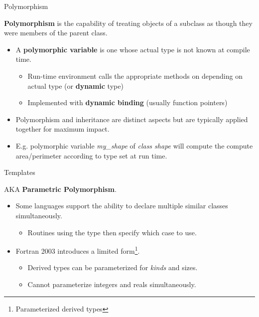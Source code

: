 \documentclass[11pt]{beamer}
\begin{document}
\begin{frame}{Polymorphism}


\textbf{Polymorphism} is the capability of treating objects of a subclass as though they were members of the parent class.
\begin{itemize}

  \item A \textbf{polymorphic variable} is one whose actual type is not known at compile time.
    \begin{itemize}
    \item Run-time environment calls the appropriate methods on depending on actual type (or \textbf{dynamic} type)
    \item Implemented with \textbf{dynamic binding} (usually function pointers)
    \end{itemize}

  \item Polymorphism and inheritance are distinct aspects but are typically applied together for maximum impact.
  \item E.g. polymorphic variable \emph{my\_shape} of \emph{class shape} will compute the compute area/perimeter according to type set at run time.
  
 \end{itemize}

\end{frame}



\begin{frame}{Templates}

AKA \textbf{Parametric Polymorphism}.
\begin{itemize}

  \item Some languages support the ability to declare multiple similar classes simultaneously.
    \begin{itemize}
    \item Routines using the type then specify which case to use.
    \end{itemize}

  \item Fortran 2003 introduces a limited form\footnote{Parameterized derived types}.
    \begin{itemize}
    \item Derived types can be parameterized for \emph{kinds} and sizes.
    \item Cannot parameterize integers and reals simultaneously.
    \end{itemize}
  
 \end{itemize}

\end{frame}
\end{document}
